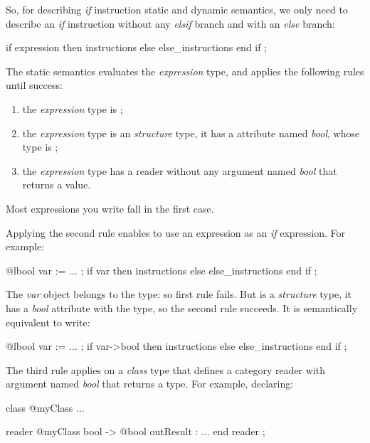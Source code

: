 So, for describing \emph{if} instruction static and dynamic semantics, we only need to describe an \emph{if} instruction without any \emph{elsif} branch and with an \emph{else} branch:
{
\begin{galgascode}
if expression then
  instructions
else
  else_instructions
end if ;
\end{galgascode}
}

The static semantics evaluates the \emph{expression} type, and applies the following rules until success:
\begin{enumerate}
\item the \emph{expression} type is ;
\item the \emph{expression} type is an \emph{structure} type, it has a attribute named \emph{bool}, whose type is ;
\item the \emph{expression} type has a reader without any argument named \emph{bool} that returns a  value.
\end{enumerate}

Most expressions you write fall in the first case.

Applying the second rule enables to use an  expression as an \emph{if} expression. For example:
{
\begin{galgascode}
@lbool var := ... ;
if var then
  instructions
else
  else_instructions
end if ;
\end{galgascode}
}

The \emph{var} object belongs to the  type: so first rule fails. But  is a \emph{structure} type, it has a \emph{bool} attribute with the  type, so the second rule succeeds. It is semantically equivalent to write:
{
\begin{galgascode}
@lbool var := ... ;
if var->bool then
  instructions
else
  else_instructions
end if ;
\end{galgascode}
}

The third rule applies on a \emph{class} type that defines a category reader with argument named \emph{bool} that returns a  type. For example, declaring:
\begin{galgascode}
class @myClass { ... }

reader @myClass bool -> @bool outResult : ... end reader ;
\end{galgascode}

